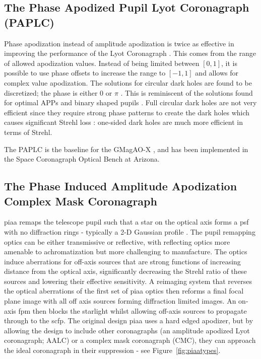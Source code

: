 \documentclass[letterpaper]{ar-1col}
\begin{document}
\subsection{The Phase Apodized Pupil Lyot Coronagraph (PAPLC)}
\label{sec:paplc}
Phase apodization instead of amplitude apodization is twice as effective in improving the performance of the Lyot Coronagraph \citep{Por20}.
%
This comes from the range of allowed apodization values.
%
Instead of being limited between $[0, 1]$, it is possible to use phase offsets to increase the range to $[-1, 1]$ and allows for complex value apodization.
%
The solutions for circular dark holes are found to be discretized; the phase is either 0 or $\pi$ \citep{Por20}.
%
This is reminiscent of the solutions found for optimal APPs \citep{Por17} and binary shaped pupils \citep{Carlotti11}.
%
Full circular dark holes are not very efficient since they require strong phase patterns to create the dark holes which causes significant Strehl loss \citep{Por17}: one-sided dark holes are much more efficient in terms of Strehl. 

The PAPLC is the baseline for the GMagAO-X \citep{Males24}, and has been implemented in the Space Coronagraph Optical Bench \citep[SCOoB; ][]{Ashcraft22,vanGorkom22} at Arizona.


\subsection{The Phase Induced Amplitude Apodization Complex Mask Coronagraph}

\ac{piaa} remaps the telescope pupil such that a star on the optical axis forms a \ac{psf} with no diffraction rings - typically a 2-D Gaussian profile \citep{Guyon03,Guyon05,Guyon14}.
%
The pupil remapping optics can be either transmissive or reflective, with reflecting optics more amenable to achromatization but more challenging to manufacture.
%
The optics induce aberrations for off-axis sources that are strong functions of increasing distance from the optical axis, significantly decreasing the Strehl ratio of these sources and lowering their effective sensitivity.
%
A reimaging system that reverses the optical aberrations of the first set of \ac{piaa} optics then reforms a final focal plane image with all off axis sources forming diffraction limited images.
%
An on-axis \ac{fpm} then blocks the starlight whilst allowing off-axis sources to propagate through to the \ac{scfp}.
%
The original design \ac{piaa} uses a hard edged apodizer, but by allowing the design to include other coronagraphs (an amplitude apodized Lyot coronagraph; AALC) or a complex mask coronagraph (CMC), they can approach the ideal coronagraph in their suppression - see Figure~\ref{fig:piaatypes}.
\end{document}
